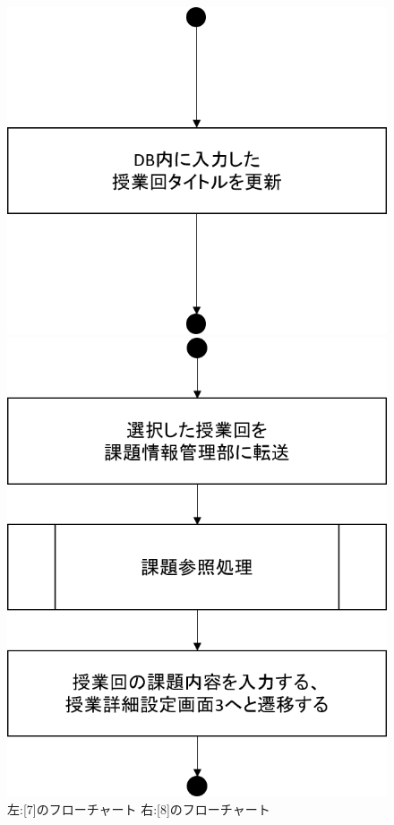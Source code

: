 \begin{figure}[htbp]
 \begin{minipage}{0.5\hsize}
  \begin{center}
   \includegraphics[width=0.45\linewidth,clip]{./img/takeover_lecture/sub7.png}
  \end{center}
 \end{minipage}
 \begin{minipage}{0.5\hsize}
  \begin{center}
   \includegraphics[width=0.45\linewidth,clip]{./img/takeover_lecture/sub8.png}
  \end{center}
 \end{minipage}
 \caption{左:[7]のフローチャート 右:[8]のフローチャート}\label{fig:takeoverlectureflow3}
\end{figure}


